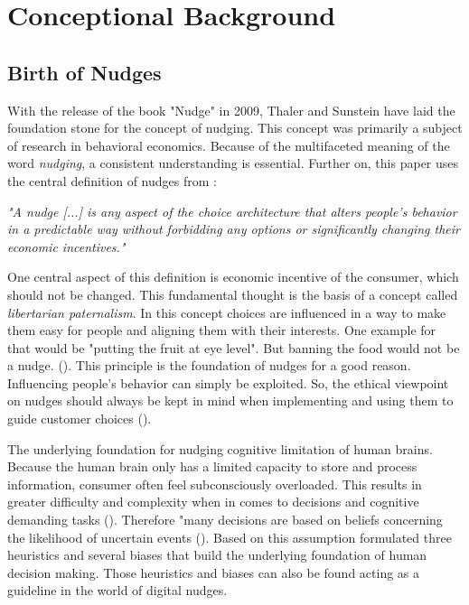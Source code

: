 \section{Conceptional Background}

\subsection{ Birth of Nudges}
With the release of the book "Nudge" in 2009, Thaler and Sunstein have laid the foundation stone for the concept of nudging. This concept was primarily a subject of research in behavioral economics. Because of the multifaceted meaning of the word \textit{nudging}, a consistent understanding is essential. Further on, this paper uses the central definition of nudges from \cite{thaler_nudge:_2009}:
\begin{center}
\textit{"A nudge [...] is any aspect of the choice architecture that alters people's behavior in a predictable way without forbidding any options or significantly changing their economic incentives."}
\end{center}

One central aspect of this definition is economic incentive of the consumer, which should not be changed. This fundamental thought is the basis of a concept called \textit{libertarian paternalism}. In this concept choices are influenced in a way to make them easy for people and aligning them with their interests. One example for that would be "putting the fruit at eye level". But banning the food would not be a nudge. (\cite{thaler_nudge:_2009}). This principle is the foundation of nudges for a good reason. Influencing people's behavior can simply be exploited. So, the ethical viewpoint on nudges should always be kept in mind when implementing and using them to guide customer choices (\cite{sunstein_nudging_2015}).

The underlying foundation for nudging cognitive limitation of human brains. Because the human brain only has a limited capacity to store and process information, consumer often feel subconsciously overloaded. This results in greater difficulty and complexity when in comes to decisions and cognitive demanding tasks (\cite{broniarczyk_decision_2014}). Therefore "many decisions are based on beliefs concerning the likelihood of uncertain events (\cite{tversky_judgment_1974}). Based on this assumption \cite{tversky_judgment_1974} formulated three heuristics and several biases that build the underlying foundation of human decision making. Those heuristics and biases can also be found acting as a guideline in the world of digital nudges.


